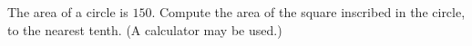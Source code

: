 The area of a circle is $150$. Compute the area of the square inscribed in the circle, to the nearest tenth. (A calculator may be used.)
